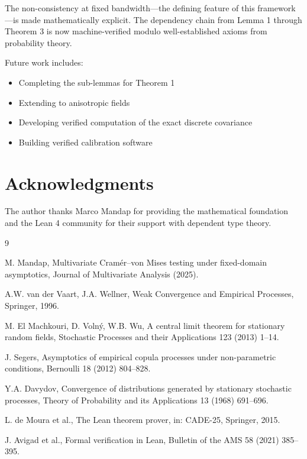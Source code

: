 \documentclass[11pt,a4paper]{article}
\theoremstyle{definition}
\begin{document}
The non-consistency at fixed bandwidth---the defining feature of this framework---is made mathematically explicit. The dependency chain from Lemma 1 through Theorem 3 is now machine-verified modulo well-established axioms from probability theory.

Future work includes:
\begin{itemize}
\item Completing the sub-lemmas for Theorem 1
\item Extending to anisotropic fields
\item Developing verified computation of the exact discrete covariance
\item Building verified calibration software
\end{itemize}

\section*{Acknowledgments}

The author thanks Marco Mandap for providing the mathematical foundation and the Lean 4 community for their support with dependent type theory.

\begin{thebibliography}{9}

M. Mandap, Multivariate Cram\'{e}r--von Mises testing under fixed-domain asymptotics, Journal of Multivariate Analysis (2025).

A.W. van der Vaart, J.A. Wellner, Weak Convergence and Empirical Processes, Springer, 1996.

M. El Machkouri, D. Voln\'{y}, W.B. Wu, A central limit theorem for stationary random fields, Stochastic Processes and their Applications 123 (2013) 1--14.

J. Segers, Asymptotics of empirical copula processes under non-parametric conditions, Bernoulli 18 (2012) 804--828.

Y.A. Davydov, Convergence of distributions generated by stationary stochastic processes, Theory of Probability and its Applications 13 (1968) 691--696.

L. de Moura et al., The Lean theorem prover, in: CADE-25, Springer, 2015.

J. Avigad et al., Formal verification in Lean, Bulletin of the AMS 58 (2021) 385--395.

\end{thebibliography}
\end{document}
